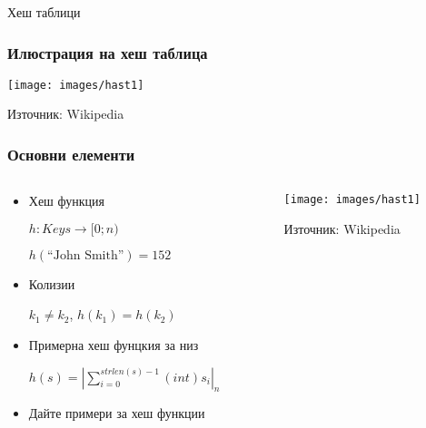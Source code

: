 \documentclass{beamer}
\begin{document}
\begin{frame}
\centerline{Хеш таблици}
\end{frame}



\begin{frame}[fragile]
\frametitle{Илюстрация на хеш таблица}
\begin{center}
\texttt{[image: images/hast1]}
  
\end{center}
\begin{center}
Източник: Wikipedia
\end{center}
\end{frame}




\begin{frame}[fragile]
\frametitle{Основни елементи}


\begin{columns}[t]
  \begin{column}{0.4\textwidth}

\begin{itemize}
  \item Хеш функция

  $h:Keys \rightarrow [0;n)$

  $h(\text{``John Smith''})=152$

  \item Колизии
  
  $k_1 \neq k_2$, $h(k_1)=h(k_2)$

  \item {Примерна хеш фунцкия за низ}

  $h(s)=|\sum\limits^{strlen(s)-1}_{i=0}(int)s_i|_n$

  \item Дайте примери за хеш функции

\end{itemize}


  \end{column}
  \begin{column}{0.6\textwidth}

\begin{center}
\texttt{[image: images/hast1]}  
\end{center}
\begin{center}
Източник: Wikipedia
\end{center}

  \end{column}
\end{columns}
\end{frame}
\end{document}
